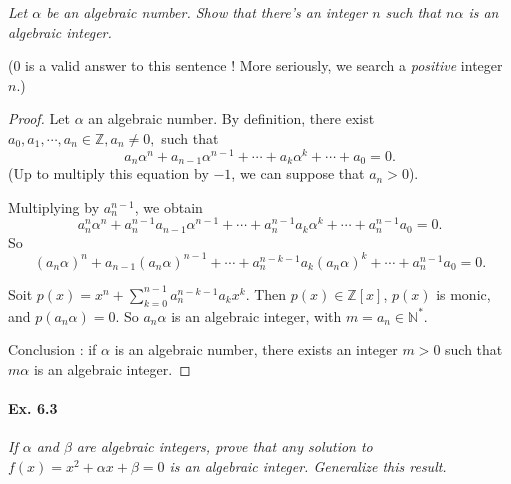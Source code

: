 \documentclass[11pt,a4paper]{article}
\newcommand{\Z}{\mathbb{Z}}
\begin{document}
{\it Let $\alpha$ be an algebraic number. Show that there's an integer $n$ such that $n\alpha$ is an algebraic integer.
}

($0$ is a valid answer to this sentence ! More seriously, we search a {\it positive} integer $n$.)

\begin{proof} 

Let  $\alpha$ an algebraic number.  By definition, there exist $a_0,a_1,\cdots,a_n \in \Z, a_n \neq 0,$ such that
$$a_n \alpha^n+ a_{n-1} \alpha^{n-1} + \cdots + a_k \alpha^k+\cdots +a_0 = 0.$$
(Up to multiply this equation by $-1$, we can suppose that $a_n >0$). 

Multiplying by $a_n^{n-1}$, we obtain
$$a_n^n \alpha^n+ a_n^{n-1}a_{n-1} \alpha^{n-1} + \cdots + a_n^{n-1} a_k \alpha^k+\cdots + a_n^{n-1} a_0 = 0.$$
So
$$(a_n \alpha)^n+ a_{n-1} (a_n\alpha)^{n-1} + \cdots + a_n^{n-k-1}a_k (a_n \alpha)^k+\cdots + a_n^{n-1} a_0 = 0.$$

Soit $p(x) = x^n +\sum\limits_{k=0}^{n-1} a_n^{n-k-1}a_k x^k$. Then $p(x) \in \mathbb{Z}[x]$, $p(x)$ is monic, and $p(a_n \alpha) = 0$. So $a_n \alpha$ is an algebraic integer, with $m = a_n \in \mathbb{N}^*$.

Conclusion : if  $\alpha$ is an algebraic number, there exists an integer $m >0$ such that $m\alpha$ is an algebraic integer.
\end{proof}

\paragraph{Ex. 6.3}

{\it If $\alpha$ and $\beta$ are algebraic integers, prove that any solution to $f(x) = x^2 + \alpha x + \beta = 0$ is an algebraic integer. Generalize this result.
}
\end{document}
